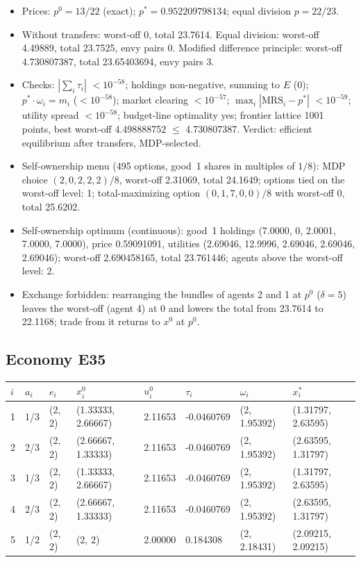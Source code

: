 \begin{itemize}[leftmargin=1.2em,itemsep=0pt,topsep=2pt]\footnotesize
\item Prices: $p^0 = 13/22$ (exact); $p^* = 0.952209798134$; equal division $p = 22/23$.
\item Without transfers: worst-off 0, total 23.7614. Equal division: worst-off 4.49889, total 23.7525, envy pairs 0. Modified difference principle: worst-off 4.730807387, total 23.65403694, envy pairs 3.
\item Checks: $|\sum_i\tau_i|$ $<10^{-58}$; holdings non-negative, summing to $E$ (0); $p^*\cdot\omega_i = m_i$ ($<10^{-58}$); market clearing $<10^{-57}$; $\max_i|\mathrm{MRS}_i - p^*|$ $<10^{-59}$; utility spread $<10^{-58}$; budget-line optimality yes; frontier lattice 1001 points, best worst-off 4.498888752 $\leq$ 4.730807387. Verdict: efficient equilibrium after transfers, MDP-selected.
\item Self-ownership menu (495 options, good~1 shares in multiples of $1/8$): MDP choice $(2, 0, 2, 2, 2)/8$, worst-off 2.31069, total 24.1649; options tied on the worst-off level: 1; total-maximizing option $(0, 1, 7, 0, 0)/8$ with worst-off 0, total 25.6202.
\item Self-ownership optimum (continuous): good~1 holdings (7.0000, 0, 2.0001, 7.0000, 7.0000), price 0.59091091, utilities (2.69046, 12.9996, 2.69046, 2.69046, 2.69046); worst-off 2.690458165, total 23.761446; agents above the worst-off level: 2.
\item Exchange forbidden: rearranging the bundles of agents 2 and 1 at $p^0$ ($\delta = 5$) leaves the worst-off (agent 4) at 0 and lowers the total from 23.7614 to 22.1168; trade from it returns to $x^0$ at $p^0$.
\end{itemize}

\subsection*{Economy E35}
\label{ec:E35}
{\scriptsize\setlength{\tabcolsep}{3pt}
\begin{tabular}{@{}llllllll@{}}
\toprule
$i$ & $a_i$ & $e_i$ & $x^0_i$ & $u^0_i$ & $\tau_i$ & $\omega_i$ & $x^*_i$ \\
\midrule
1 & 1/3 & (2, 2) & (1.33333, 2.66667) & 2.11653 & -0.0460769 & (2, 1.95392) & (1.31797, 2.63595) \\
2 & 2/3 & (2, 2) & (2.66667, 1.33333) & 2.11653 & -0.0460769 & (2, 1.95392) & (2.63595, 1.31797) \\
3 & 1/3 & (2, 2) & (1.33333, 2.66667) & 2.11653 & -0.0460769 & (2, 1.95392) & (1.31797, 2.63595) \\
4 & 2/3 & (2, 2) & (2.66667, 1.33333) & 2.11653 & -0.0460769 & (2, 1.95392) & (2.63595, 1.31797) \\
5 & 1/2 & (2, 2) & (2, 2) & 2.00000 & 0.184308 & (2, 2.18431) & (2.09215, 2.09215) \\
\bottomrule\end{tabular}}

